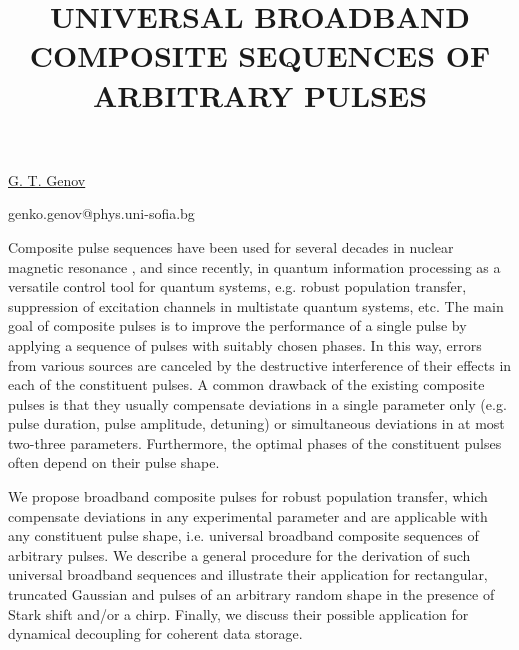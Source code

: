 \title{UNIVERSAL BROADBAND COMPOSITE SEQUENCES OF ARBITRARY PULSES}

\underline{G. T. Genov} 

{\normalsize{

\vspace{-4mm} \unisofia

\email genko.genov@phys.uni-sofia.bg}}

Composite pulse sequences have been used for several decades in nuclear magnetic resonance , and
since recently, in quantum information processing as a versatile control tool for quantum systems,
e.g. robust population transfer, suppression of excitation channels in multistate quantum systems,
etc. The main goal of composite pulses is to improve the performance of a single pulse by applying a
sequence of pulses with suitably chosen phases. In this way, errors from various sources are
canceled by the destructive interference of their effects in each of the constituent pulses. A
common drawback of the existing composite pulses is that they usually compensate deviations in a
single parameter only (e.g. pulse duration, pulse amplitude, detuning) or simultaneous deviations in
at most two-three parameters. Furthermore, the optimal phases of the constituent pulses often depend
on their pulse shape.

We propose broadband composite pulses for robust population transfer, which compensate deviations in
any experimental parameter and are applicable with any constituent pulse shape, i.e. universal
broadband composite sequences of arbitrary pulses. We describe a general procedure for the
derivation of such universal broadband sequences and illustrate their application for rectangular,
truncated Gaussian and pulses of an arbitrary random shape in the presence of Stark shift and/or a
chirp. Finally, we discuss their possible application for dynamical decoupling for coherent data
storage. 

\vspace{\baselineskip}
